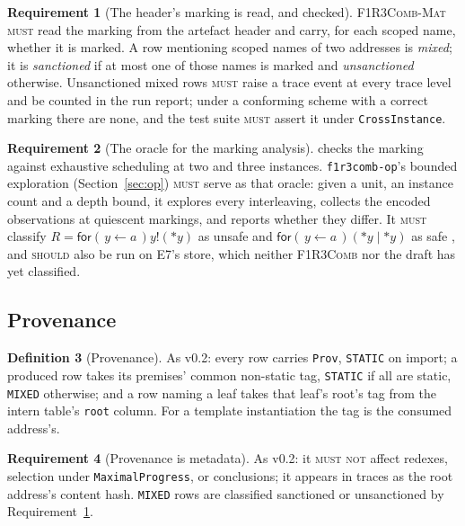 \documentclass[11pt,a4paper]{article}
\newcommand{\code}[1]{\texttt{#1}}
\newcommand{\Comb}{\textsc{F1R3Comb}}
\newcommand{\Mat}{\textsc{F1R3Comb-Mat}}
\newcommand{\MUST}{\textsc{must}}
\newcommand{\MUSTNOT}{\textsc{must not}}
\newcommand{\SHOULD}{\textsc{should}}
\newcommand{\drp}[1]{{*}#1}
\theoremstyle{definition}
\newtheorem{definition}{Definition}[section]
\newtheorem{requirement}[definition]{Requirement}
\theoremstyle{plain}
\newcommand{\inp}[3]{\mathsf{for}(\,#1 \leftarrow #2\,)#3}
\newcommand{\out}[2]{#1!(#2)}
\begin{document}
\begin{requirement}[The header's marking is read, and checked]
\label{req:marking}
\Mat{} \MUST{} read the marking from the artefact header and carry, for each
scoped name, whether it is marked. A row mentioning scoped names of two
addresses is \emph{mixed}; it is \emph{sanctioned} if at most one of those
names is marked and \emph{unsanctioned} otherwise. Unsanctioned mixed rows
\MUST{} raise a trace event at every trace level and be counted in the run
report; under a conforming scheme with a correct marking there are none, and
the test suite \MUST{} assert it under \code{CrossInstance}.
\end{requirement}

\begin{requirement}[The oracle for the marking analysis]\label{req:oracle}
\cite[Obl.~11.4]{combspec} checks the marking against exhaustive scheduling
at two and three instances. \code{f1r3comb-op}'s bounded exploration
(Section~\ref{sec:op}) \MUST{} serve as that oracle: given a unit, an instance
count and a depth bound, it explores every interleaving, collects the encoded
observations at quiescent markings, and reports whether they differ. It
\MUST{} classify $R = \inp{y}{a}{\out{y}{\drp{y}}}$ as unsafe and
$\inp{y}{a}{(\drp{y} \mid \drp{y})}$ as safe \cite[Req.~5.18]{combspec},
and \SHOULD{} also be run on E7's store, which neither \Comb{} nor the draft
has yet classified.
\end{requirement}

\subsection{Provenance}\label{sec:prov}

\begin{definition}[Provenance]\label{def:prov}
As v0.2: every row carries \code{Prov}, \code{STATIC} on import; a produced
row takes its premises' common non-static tag, \code{STATIC} if all are
static, \code{MIXED} otherwise; and a row naming a leaf takes that leaf's
root's tag from the intern table's \code{root} column. For a template
instantiation the tag is the consumed address's.
\end{definition}

\begin{requirement}[Provenance is metadata]\label{req:provmeta}
As v0.2: it \MUSTNOT{} affect redexes, selection under
\code{MaximalProgress}, or conclusions; it appears in traces as the root
address's content hash. \code{MIXED} rows are classified sanctioned or
unsanctioned by Requirement~\ref{req:marking}.
\end{requirement}
\end{document}

